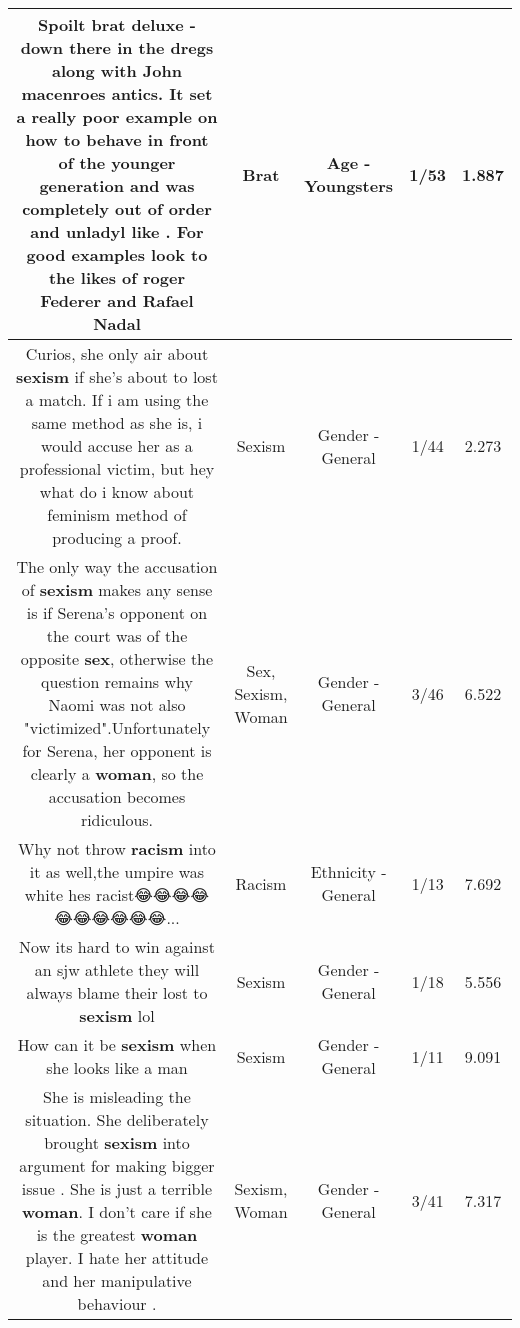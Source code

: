 \documentclass[11pt]{article}
\newlength\mylength
\begin{document}
\begin{center}
\begin{longtable}{|C{.65\mylength}|C{.30\mylength}|C{.12\mylength}|C{.12\mylength}|C{.12\mylength}|}
  \small Spoilt \textbf{brat} deluxe - down there in the dregs along with John macenroes antics. It set a really  poor example on how to behave in front of the younger generation  and was completely  out of order and unladyl like . For good examples look to the likes of roger Federer and Rafael Nadal\normalsize   & Brat & Age - Youngsters & 1/53 & 1.887 \\  \hline
  \small Curios, she only air about \textbf{sexism} if she's about to lost a match. If i am using the same method as she is, i would accuse her as a professional victim, but hey what do i know about feminism method  of producing a proof.\normalsize   & Sexism & Gender - General & 1/44 & 2.273 \\  \hline
  \small The only way the accusation of \textbf{sexism} makes any sense is if Serena's opponent on the court was of the opposite \textbf{sex}, otherwise the question remains why Naomi was not also "victimized".Unfortunately for Serena, her opponent is clearly a \textbf{woman}, so the accusation becomes ridiculous.\normalsize   & Sex, Sexism, Woman & Gender - General & 3/46 & 6.522 \\  \hline
  \small Why not throw \textbf{racism} into it as well,the umpire was white hes racist😂😂😂😂😂😂😂😂😂😂...\normalsize   & Racism & Ethnicity - General & 1/13 & 7.692 \\  \hline
  \small Now its hard to win against an sjw athlete they will always blame their lost to \textbf{sexism} lol\normalsize   & Sexism & Gender - General & 1/18 & 5.556 \\  \hline
  \small How can it be \textbf{sexism} when she looks like a man\normalsize   & Sexism & Gender - General & 1/11 & 9.091 \\  \hline
  \small She is misleading the situation. She deliberately brought \textbf{sexism} into argument for making bigger issue . She is just a terrible \textbf{woman}. I don't care if she is the greatest \textbf{woman} player. I hate her attitude and  her manipulative behaviour .\normalsize   & Sexism, Woman & Gender - General & 3/41 & 7.317 \\  \hline

\end{longtable}
\end{center}
\end{document}
